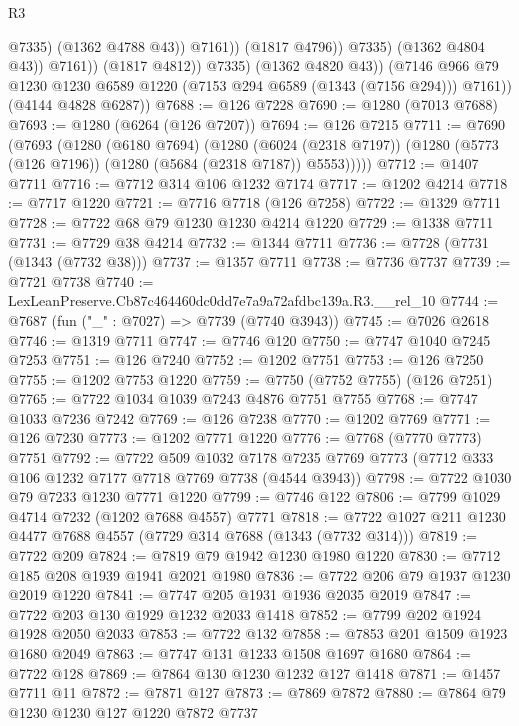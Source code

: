 \begin{lexlean}{R3}
\begin{coremodule}
                                @7335)
                              (@1362 @4788 @43))
                            @7161))
                        (@1817 @4796))
                      @7335)
                    (@1362 @4804 @43))
                  @7161))
              (@1817 @4812))
            @7335)
          (@1362 @4820 @43))
        (@7146 @966 @79 @1230 @1230 @6589 @1220 (@7153 @294 @6589 (@1343 (@7156 @294))) @7161))
      (@4144 @4828 @6287))
@7688 := @126 @7228
@7690 := @1280 (@7013 @7688)
@7693 := @1280 (@6264 (@126 @7207))
@7694 := @126 @7215
@7711 := @7690
    (@7693
      (@1280
        (@6180 @7694)
        (@1280
          (@6024 (@2318 @7197))
          (@1280 (@5773 (@126 @7196)) (@1280 (@5684 (@2318 @7187)) @5553)))))
@7712 := @1407 @7711
@7716 := @7712 @314 @106 @1232 @7174
@7717 := @1202 @4214
@7718 := @7717 @1220
@7721 := @7716 @7718 (@126 @7258)
@7722 := @1329 @7711
@7728 := @7722 @68 @79 @1230 @1230 @4214 @1220
@7729 := @1338 @7711
@7731 := @7729 @38 @4214
@7732 := @1344 @7711
@7736 := @7728 (@7731 (@1343 (@7732 @38)))
@7737 := @1357 @7711
@7738 := @7736 @7737
@7739 := @7721 @7738
@7740 := LexLeanPreserve.Cb87c464460dc0dd7e7a9a72afdbc139a.R3.__rel_10
@7744 := @7687 (fun ("_" : @7027) => @7739 (@7740 @3943))
@7745 := @7026 @2618
@7746 := @1319 @7711
@7747 := @7746 @120
@7750 := @7747 @1040 @7245 @7253
@7751 := @126 @7240
@7752 := @1202 @7751
@7753 := @126 @7250
@7755 := @1202 @7753 @1220
@7759 := @7750 (@7752 @7755) (@126 @7251)
@7765 := @7722 @1034 @1039 @7243 @4876 @7751 @7755
@7768 := @7747 @1033 @7236 @7242
@7769 := @126 @7238
@7770 := @1202 @7769
@7771 := @126 @7230
@7773 := @1202 @7771 @1220
@7776 := @7768 (@7770 @7773) @7751
@7792 := @7722
    @509
    @1032
    @7178
    @7235
    @7769
    @7773
    (@7712 @333 @106 @1232 @7177 @7718 @7769 @7738 (@4544 @3943))
@7798 := @7722 @1030 @79 @7233 @1230 @7771 @1220
@7799 := @7746 @122
@7806 := @7799 @1029 @4714 @7232 (@1202 @7688 @4557) @7771
@7818 := @7722 @1027 @211 @1230 @4477 @7688 @4557 (@7729 @314 @7688 (@1343 (@7732 @314)))
@7819 := @7722 @209
@7824 := @7819 @79 @1942 @1230 @1980 @1220
@7830 := @7712 @185 @208 @1939 @1941 @2021 @1980
@7836 := @7722 @206 @79 @1937 @1230 @2019 @1220
@7841 := @7747 @205 @1931 @1936 @2035 @2019
@7847 := @7722 @203 @130 @1929 @1232 @2033 @1418
@7852 := @7799 @202 @1924 @1928 @2050 @2033
@7853 := @7722 @132
@7858 := @7853 @201 @1509 @1923 @1680 @2049
@7863 := @7747 @131 @1233 @1508 @1697 @1680
@7864 := @7722 @128
@7869 := @7864 @130 @1230 @1232 @127 @1418
@7871 := @1457 @7711 @11
@7872 := @7871 @127
@7873 := @7869 @7872
@7880 := @7864 @79 @1230 @1230 @127 @1220 @7872 @7737

\end{coremodule}
\end{lexlean}
